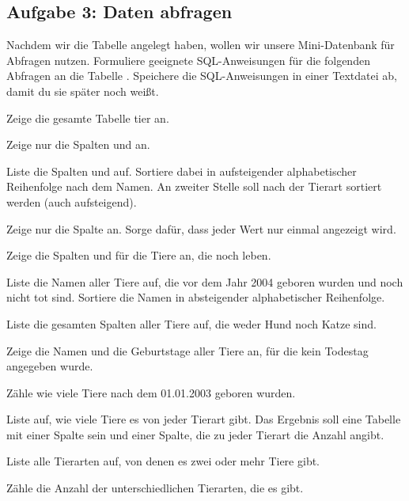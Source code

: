 \subsection{Aufgabe 3: Daten abfragen}

Nachdem wir die Tabelle  angelegt haben, wollen wir unsere
Mini-Datenbank für Abfragen nutzen. Formuliere geeignete SQL-Anweisungen für die
folgenden Abfragen an die Tabelle . Speichere die
SQL-Anweisungen in einer Textdatei ab, damit du sie später noch weißt.

\begin{compactenum}[a)]
\item Zeige die gesamte Tabelle tier an.
\item Zeige nur die Spalten  und  an.
\item Liste die Spalten  und  auf.
Sortiere dabei in aufsteigender alphabetischer Reihenfolge nach dem Namen. An
zweiter Stelle soll nach der Tierart sortiert werden (auch aufsteigend).
\item Zeige nur die Spalte  an. Sorge dafür, dass jeder
Wert nur einmal angezeigt wird.
\item Zeige die Spalten  und  für die
Tiere an, die noch leben.
\item Liste die Namen aller Tiere auf, die vor dem Jahr 2004 geboren wurden und
 noch nicht tot sind. Sortiere die Namen in absteigender alphabetischer
 Reihenfolge.
\item Liste die gesamten Spalten aller Tiere auf, die weder Hund noch Katze
sind.
\item Zeige die Namen und die Geburtstage aller Tiere an, für die kein Todestag
 angegeben wurde.
\item Zähle wie viele Tiere nach dem 01.01.2003 geboren wurden.
\item Liste auf, wie viele Tiere es von jeder Tierart gibt. Das Ergebnis soll
eine Tabelle mit einer Spalte  sein und einer Spalte, die
zu jeder Tierart die Anzahl angibt.
\item Liste alle Tierarten auf, von denen es zwei oder mehr Tiere gibt.
\item Zähle die Anzahl der unterschiedlichen Tierarten, die es gibt.
\end{compactenum}
